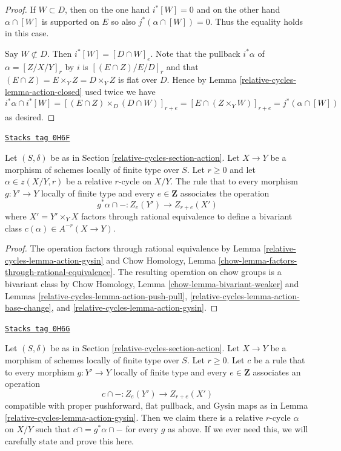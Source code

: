 \begin{proof}
\medskip\noindent
If $W \subset D$, then on the one hand $i^*[W] = 0$ and on the
other hand $\alpha \cap [W]$ is supported on $E$ so also
$j^*(\alpha \cap [W]) = 0$. Thus the equality holds in this case.

\medskip\noindent
Say $W \not \subset D$. Then $i^*[W] = [D \cap W]_e$.
Note that the pullback $i^*\alpha$ of $\alpha = [Z/X/Y]_r$
by $i$ is $[(E \cap Z)/E/D]_r$ and that
$(E \cap Z) = E \times_Y Z = D \times_Y Z$
is flat over $D$. Hence by Lemma \ref{relative-cycles-lemma-action-closed}
used twice we have
$$
i^*\alpha \cap i^*[W] =
[(E \cap Z) \times_D (D \cap W)]_{r + e} =
[E \cap (Z \times_Y W)]_{r + e} =
j^*(\alpha \cap [W])
$$
as desired.
\end{proof}

\begin{proposition}
\label{relative-cycles-proposition-get-bivariant-class}
\href{https://stacks.math.columbia.edu/tag/0H6F}{\texttt{Stacks tag 0H6F}}

Let $(S, \delta)$ be as in Section \ref{relative-cycles-section-action}. Let $X \to Y$
be a morphism of schemes locally of finite type over $S$. Let $r \geq 0$
and let $\alpha \in z(X/Y, r)$ be a relative $r$-cycle on $X/Y$.
The rule that to every morphism $g : Y' \to Y$ locally of finite type
and every $e \in \mathbf{Z}$ associates the operation
$$
g^*\alpha \cap - : Z_e(Y') \to Z_{r + e}(X')
$$
where $X' = Y' \times_Y X$ factors through rational equivalence to
define a bivariant class $c(\alpha) \in A^{-r}(X \to Y)$.
\end{proposition}

\begin{proof}
The operation factors through rational equivalence by
Lemma \ref{relative-cycles-lemma-action-gysin} and
Chow Homology, Lemma \ref{chow-lemma-factors-through-rational-equivalence}.
The resulting operation on chow groups is a bivariant class by
Chow Homology, Lemma \ref{chow-lemma-bivariant-weaker}
and
Lemmas \ref{relative-cycles-lemma-action-push-pull}, \ref{relative-cycles-lemma-action-base-change}, and
\ref{relative-cycles-lemma-action-gysin}.
\end{proof}

\begin{remark}
\label{relative-cycles-remark-characterize-relative-cycles}
\href{https://stacks.math.columbia.edu/tag/0H6G}{\texttt{Stacks tag 0H6G}}

Let $(S, \delta)$ be as in Section \ref{relative-cycles-section-action}. Let $X \to Y$
be a morphism of schemes locally of finite type over $S$. Let $r \geq 0$.
Let $c$ be a rule that to every morphism $g : Y' \to Y$ locally of finite
type and every $e \in \mathbf{Z}$ associates an operation
$$
c \cap - : Z_e(Y') \to Z_{r + e}(X')
$$
compatible with proper pushforward, flat pullback, and Gysin maps as in
Lemma \ref{relative-cycles-lemma-action-gysin}. Then we claim there is a relative $r$-cycle
$\alpha$ on $X/Y$ such that $c \cap = g^*\alpha \cap -$ for every $g$ as above.
If we ever need this, we will carefully state and prove this here.
\end{remark}

